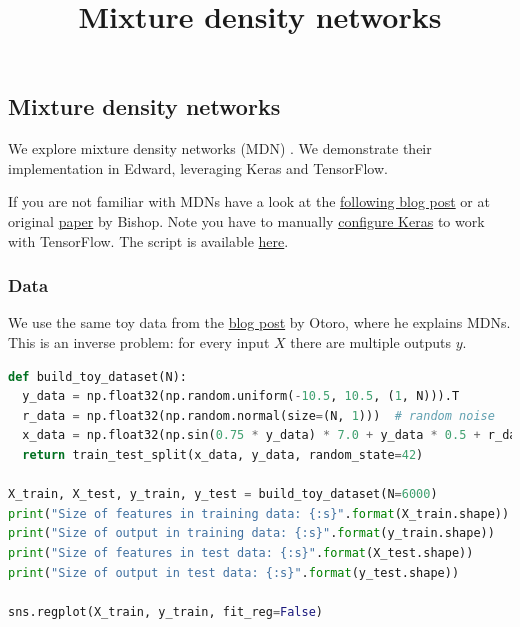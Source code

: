 \title{Mixture density networks}

\subsection{Mixture density networks}

We explore mixture density networks (MDN) \citep{bishop1994mixture}. We
demonstrate their implementation in Edward, leveraging Keras and
TensorFlow.

If you are not familiar with MDNs have a look at the
\href{http://cbonnett.github.io/MDN.html}{following blog post} or at
original
\href{http://research.microsoft.com/en-us/um/people/cmbishop/downloads/Bishop-NCRG-94-004.pdf}{paper}
by Bishop.
Note you have to manually \href{https://keras.io/backend/}
{configure Keras} to work with TensorFlow.
The script is available
\href{https://github.com/blei-lab/edward/blob/master/examples/tf_mixture_density_network_demo.py}
{here}.

\subsubsection{Data}

We use the same toy data from the \href{http://blog.otoro.net/2015/11/24/mixture-density-networks-with-tensorflow/}{blog post} by Otoro, where he explains MDNs. This is an inverse problem: for every input $X$ there are multiple outputs $y$.

\begin{lstlisting}[language=Python]
def build_toy_dataset(N):
  y_data = np.float32(np.random.uniform(-10.5, 10.5, (1, N))).T
  r_data = np.float32(np.random.normal(size=(N, 1)))  # random noise
  x_data = np.float32(np.sin(0.75 * y_data) * 7.0 + y_data * 0.5 + r_data * 1.0)
  return train_test_split(x_data, y_data, random_state=42)

X_train, X_test, y_train, y_test = build_toy_dataset(N=6000)
print("Size of features in training data: {:s}".format(X_train.shape))
print("Size of output in training data: {:s}".format(y_train.shape))
print("Size of features in test data: {:s}".format(X_test.shape))
print("Size of output in test data: {:s}".format(y_test.shape))

sns.regplot(X_train, y_train, fit_reg=False)
\end{lstlisting}

